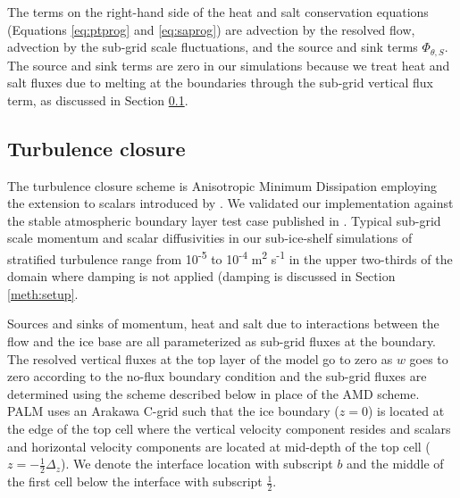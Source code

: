 \documentclass[draft]{agujournal2019}
\begin{document}
The terms on the right-hand side of the heat and salt conservation equations (Equations \ref{eq:ptprog} and \ref{eq:saprog}) are advection by the resolved flow, advection by the sub-grid scale fluctuations, and the source and sink terms  $\Phi_{\theta,S}$. The source and sink terms are zero in our simulations because we treat heat and salt fluxes due to melting at the boundaries through the sub-grid vertical flux term, as discussed in Section \ref{meth:tcm}. 


\subsection{Turbulence closure}\label{meth:tcm}

The turbulence closure scheme is Anisotropic Minimum Dissipation \cite{rozema_minimum-dissipation_2015} employing the extension to scalars introduced by . We validated our implementation against the stable atmospheric boundary layer test case published in . Typical sub-grid scale momentum and scalar diffusivities in our sub-ice-shelf simulations of stratified turbulence range from 10\textsuperscript{-5} to 10\textsuperscript{-4} m\textsuperscript{2} s\textsuperscript{-1} in the upper two-thirds of the domain where damping is not applied (damping is discussed in Section \ref{meth:setup}. 

Sources and sinks of momentum, heat and salt due to interactions between the flow and the ice base are all parameterized as sub-grid fluxes at the boundary. The resolved vertical fluxes at the top layer of the model go to zero as $w$ goes to zero according to the no-flux boundary condition and the sub-grid fluxes are determined using the scheme described below in place of the AMD scheme. PALM uses an Arakawa C-grid such that the ice boundary ($z=0$) is located at the edge of the top cell where the vertical velocity component resides and scalars and horizontal velocity components are located at mid-depth of the top cell ($z=-\frac{1}{2}\Delta_z$). We denote the interface location with subscript $b$ and the middle of the first cell below the interface with subscript $\frac{1}{2}$.
\end{document}
